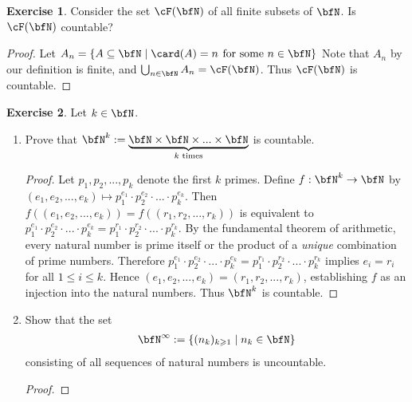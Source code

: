 \documentclass[10pt,twoside,openany]{memoir}
\theoremstyle{plain}
\theoremstyle{definition}
\newtheorem{exercise}{Exercise}
\theoremstyle{remark}
\numberwithin{equation}{section}
\renewcommand{\geq}{\geqslant}
\renewcommand{\leq}{\leqslant}
\begin{document}
    \begin{exercise}
        Consider the set $\cF(\bfN)$ of all finite subsets of $\bfN$. Is $\cF(\bfN)$ countable?
    \end{exercise}
        \begin{proof}
            Let $A_n = \{A \subseteq \bfN \mid \card(A) = n\hspace{4pt}\text{for some $n \in \bfN$}\}$ Note that $A_n$ by our definition is finite, and $\bigcup_{n \in \bfN}A_n = \cF(\bfN)$. Thus $\cF(\bfN)$ is countable.
        \end{proof}
    \begin{exercise}
        Let $k \in \bfN$.
            \begin{enumerate}[label = (\roman*)]
                \item Prove that $\bfN ^k : = \underbrace{\bfN \times \bfN \times ... \times \bfN}_{\text{$k$ times}}$ is countable.
                    \begin{proof}
                        Let $p_1,p_2,...,p_k$ denote the first $k$ primes. Define $f:\bfN^k \rightarrow \bfN$ by $(e_1,e_2,...,e_k) \mapsto p_1^{e_1} \cdot p_2^{e_2}\cdot ...\cdot p_k^{e_k}$. Then $f((e_1,e_2,...,e_k)) = f((r_1,r_2,...,r_k))$ is equivalent to $p_1^{e_1}\cdot p_2^{e_2}\cdot...\cdot p_k^{e_k} = p_1^{r_1}\cdot p_2^{r_2}\cdot...\cdot p_k^{r_k}$. By the fundamental theorem of arithmetic, every natural number is prime itself or the product of a \textit{unique} combination of prime numbers. Therefore $p_1^{e_1}\cdot p_2^{e_2}\cdot...\cdot p_k^{e_k} = p_1^{r_1}\cdot p_2^{r_2}\cdot...\cdot p_k^{r_k}$ implies $e_i = r_i$ for all $1 \leq i \leq k$. Hence $(e_1,e_2,...,e_k) = (r_1,r_2,...,r_k)$, establishing $f$ as an injection into the natural numbers. Thus $\bfN^k$ is countable.
                    \end{proof}
                \item Show that the set
                    \begin{equation*}
                    \begin{split}
                        \bfN^{\infty} := \{(n_k)_{k \geq 1} \mid n_k \in \bfN \}
                    \end{split}
                    \end{equation*}
                consisting of all sequences of natural numbers is uncountable.
                    \begin{proof}

\end{proof}
\end{enumerate}
\end{exercise}
\end{document}
